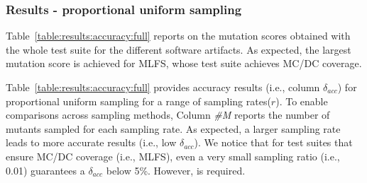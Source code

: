 


\subsubsection*{Results - proportional uniform sampling}

%




Table~\ref{table:results:accuracy:full} reports on the mutation scores obtained with the whole test suite for the different software artifacts. 
As expected, the largest mutation score is achieved for MLFS, whose test suite achieves MC/DC coverage.

Table~\ref{table:results:accuracy:full} provides accuracy results (i.e., column $\delta_{acc}$) for proportional uniform sampling for a range of sampling rates($r$). 
To enable comparisons across sampling methods, Column \emph{\#M} reports the number of mutants sampled for each sampling rate.
As expected, a larger sampling rate leads to more accurate results (i.e., low $\delta_{acc}$). 
We notice that for test suites that ensure MC/DC coverage (i.e., MLFS), even a very small sampling ratio (i.e., 0.01) guarantees a $\delta_{acc}$ below 5\%. However,  is required.


